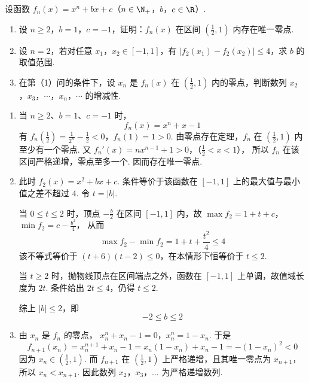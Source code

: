 \begin{problem}
设函数 \(f_{n}(x) = x^{n} + bx + c\)（\(n \in \N_+\)，\(b\)，\(c \in \R\)）.

\begin{enumerate}
\item 设 \(n \geqslant 2\)，\(b = 1\)，\(c = -1\)，证明：\(f_n(x)\) 在区间 \(\left(\frac{1}{2}, 1\right)\) 内存在唯一零点.
\item 设 \(n = 2\)，若对任意 \(x_1\)，\(x_2 \in [-1, 1]\)，有 \(|f_2(x_1) - f_2(x_2)| \leqslant 4\)，求 \(b\) 的取值范围.
\item 在第（1）问的条件下，设 \(x_{n}\) 是 \(f_{n}(x)\) 在 \(\left(\frac{1}{2}, 1\right)\) 内的零点，判断数列 \(x_{2}\)，\(x_{3}\)，\(\cdots\)，\(x_{n}\)，\(\cdots\) 的增减性.
\end{enumerate}
\end{problem}

\begin{solution}
\begin{enumerate}
\item 当 \(n\geqslant2\)、\(b=1\)、\(c=-1\) 时，
\[
f_n(x)=x^n+x-1
\]
有
\(f_n\left(\frac12\right)=\frac1{2^n}-\frac12<0\)，\(f_n(1)=1>0\).
由零点存在定理，\(f_n\) 在 \((\frac{1}{2},1)\) 内至少有一个零点. 又
\(f_n'(x)=nx^{n-1}+1>0\)，（\(\frac12<x<1\)），
所以 \(f_n\) 在该区间严格递增，零点至多一个. 因而存在唯一零点.

\item 此时 \(f_2(x)=x^2+bx+c\). 条件等价于该函数在 \([-1,1]\) 上的最大值与最小值之差不超过 \(4\). 令 \(t=|b|\).

当 \(0\leqslant t\leqslant2\) 时，顶点 \(-\frac{b}{2}\) 在区间 \([-1,1]\) 内，故
\(\max f_2=1+t+c\)，\(\min f_2=c-\frac{b^2}{4}\)，
从而
\[
\max f_2-\min f_2=1+t+\frac{t^2}{4}\leqslant4
\]
该不等式等价于 \((t+6)(t-2)\leqslant0\)，在本情形下恒等价于 \(t\leqslant2\).

当 \(t\geqslant2\) 时，抛物线顶点在区间端点之外，函数在 \([-1,1]\) 上单调，故值域长度为 \(2t\). 条件给出 \(2t\leqslant4\)，仍得 \(t\leqslant2\).

综上 \(|b|\leqslant2\)，即
\[
-2\leqslant b\leqslant2
\]

\item 由 \(x_n\) 是 \(f_n\) 的零点，
\(x_n^n+x_n-1=0\)，\(x_n^n=1-x_n\).
于是
\[
f_{n+1}(x_n)
=x_n^{n+1}+x_n-1
=x_n(1-x_n)+x_n-1
=-(1-x_n)^2<0
\]
因为 \(x_n\in(\frac{1}{2},1)\). 而 \(f_{n+1}\) 在 \((\frac{1}{2},1)\) 上严格递增，且其唯一零点为 \(x_{n+1}\)，所以 \(x_n<x_{n+1}\). 因此数列 \(x_2\)，\(x_3\)，\(\ldots\) 为严格递增数列.
\end{enumerate}
\end{solution}
